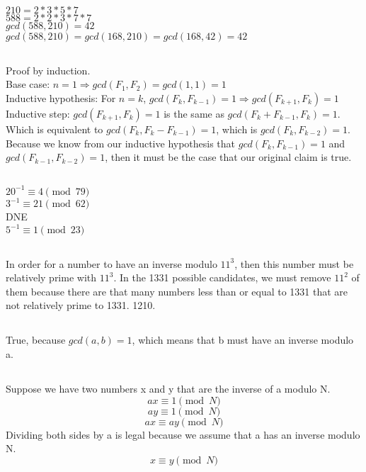 \documentclass{article}
\begin{document}
\subsection{}$210=2*3*5*7$\\
$588=2*2*3*7*7$\\
$gcd(588,210)=42$\\
$gcd(588,210)=gcd(168,210)=gcd(168,42)=42$
\subsection{}Proof by induction.\\ 
Base case: $n=1 \Rightarrow gcd(F_1,F_2)=gcd(1,1)=1$\\
Inductive hypothesis: For $n=k$, $gcd(F_k,F_{k-1})=1 \Rightarrow gcd(F_{k+1},F_k)=1$
Inductive step: $gcd(F_{k+1},F_k)=1$ is the same as $gcd(F_k+F_{k-1},F_k)=1$. Which is equivalent to $gcd(F_k,F_k-F_{k-1})=1$, which is $gcd(F_k,F_{k-2})=1$. Because we know from our inductive hypothesis that $gcd(F_k,F_{k-1})=1$ and $gcd(F_{k-1},F_{k-2})=1$, then it must be the case that our original claim is true. 
\subsection{}$20^{-1} \equiv 4 \pmod{79}$\\
$3^{-1} \equiv 21 \pmod{62}$\\
DNE\\
$5^{-1} \equiv 1 \pmod{23}$
\subsection{}
In order for a number to have an inverse modulo $11^3$, then this number must be relatively prime with $11^3$. In the 1331 possible candidates, we must remove $11^2$ of them because there are that many numbers less than or equal to 1331 that are not relatively prime to 1331. 1210. 
\subsection{}True, because $gcd(a,b)=1$, which means that b must have an inverse modulo a.
\subsection{}Suppose we have two numbers x and y that are the inverse of a modulo N. 
$$ax \equiv 1\pmod N$$
$$ay \equiv 1\pmod N$$
$$ax \equiv ay\pmod N$$
Dividing both sides by a is legal because we assume that a has an inverse modulo N.
$$x \equiv y \pmod N$$
\end{document}
